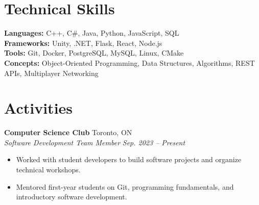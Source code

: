 \documentclass[11pt,letterpaper]{article}
\newcommand{\resumeEntry}[4]{
    \textbf{#1} \hfill #2 \\
    \textit{#3} \hfill \textit{#4}
}
\begin{document}

\section{Technical Skills}

\textbf{Languages:} C++, C\#, Java, Python, JavaScript, SQL \\[2pt]
\textbf{Frameworks:} Unity, .NET, Flask, React, Node.js \\[2pt]
\textbf{Tools:} Git, Docker, PostgreSQL, MySQL, Linux, CMake \\[2pt]
\textbf{Concepts:} Object-Oriented Programming, Data Structures, Algorithms, REST APIs, Multiplayer Networking


\section{Activities}

\resumeEntry
    {Computer Science Club}
    {Toronto, ON}
    {Software Development Team Member}
    {Sep. 2023 -- Present}

\begin{itemize}
    \item Worked with student developers to build software projects and organize technical workshops.
    \item Mentored first-year students on Git, programming fundamentals, and introductory software development.
\end{itemize}
\end{document}

